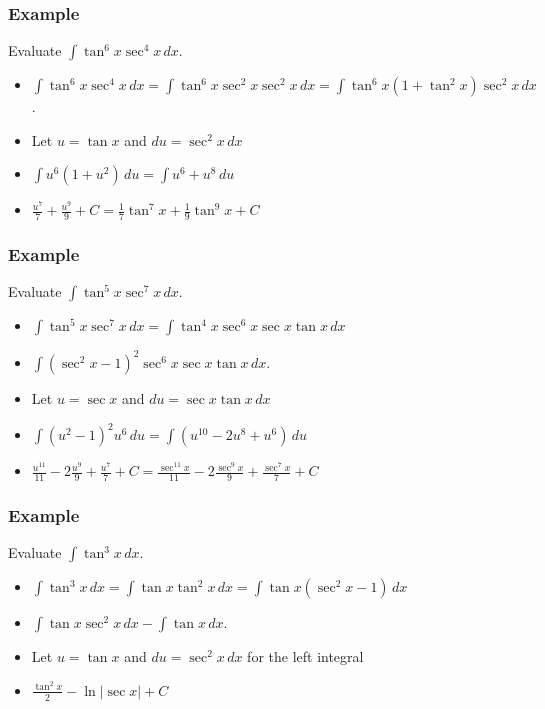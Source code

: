 \documentclass[t]{beamer}
\theoremstyle{plain}
\theoremstyle{definition}
\newcommand{\ds}{\displaystyle}
\begin{document}
\begin{frame}
\frametitle{Example} 

Evaluate $\ds\int\tan^6x\sec^4x\,dx$. \pause

\begin{itemize}
	\item $\ds\int\tan^6x\sec^4x\,dx = \ds\int\tan^6x\sec^2x \sec^2x \,dx = \ds\int\tan^6x (1 + \tan^2x) \sec^2x \,dx $.
	\item Let $u = \tan{x}$ and $du = \sec^2x \,dx$
	\item $\ds\int u^6 ( 1 + u^2) \, du = \ds\int u^6 + u^8 \, du $
	\item $\ds\frac{u^7}{7} + \frac{u^9}{9} + C = \frac{1}{7} \tan^7{x} + \frac{1}{9} \tan^9{x} + C$
\end{itemize}

\end{frame}

\begin{frame}
\frametitle{Example} 

Evaluate $\ds\int\tan^5x\sec^7x\,dx$. \pause

\begin{itemize}
	\item $\ds\int\tan^5x\sec^7x\,dx = \ds\int\tan^4x\sec^6x \sec x \tan x \,dx $
	\item $\ds\int(\sec^2x - 1)^2\sec^6x \sec x \tan x \,dx $.
	\item Let $u = \sec{x}$ and $du = \sec x \tan x \,dx$
	\item $\ds\int (u^2 - 1)^2 u^6 \, du = \ds\int (u^{10} - 2u^8 + u^6) \, du $
	\item $\ds\frac{u^{11}}{11} - 2\frac{u^9}{9} + \frac{u^7}{7} + C = \frac{\sec^{11}{x}}{11} - 2\frac{\sec^9{x}}{9} + \frac{\sec^7{x}}{7} + C$
\end{itemize}

\end{frame}

\begin{frame}
\frametitle{Example} 

Evaluate $\ds\int\tan^3x \,dx$. \pause

\begin{itemize}
	\item $\ds\int\tan^3x \,dx = \ds\int \tan x \tan^2x \,dx = \ds \int \tan x (\sec^2x - 1)\,dx $
	\item $\ds \int \tan x \sec^2x \,dx - \int \tan{x} \,dx $.
	\item Let $u = \tan{x}$ and $du = \sec^2x \,dx$ for the left integral
	\item $\ds\frac{\tan^{2}{x}}{2} - \ln |\sec{x}| + C$
\end{itemize}

\end{frame}
\end{document}
